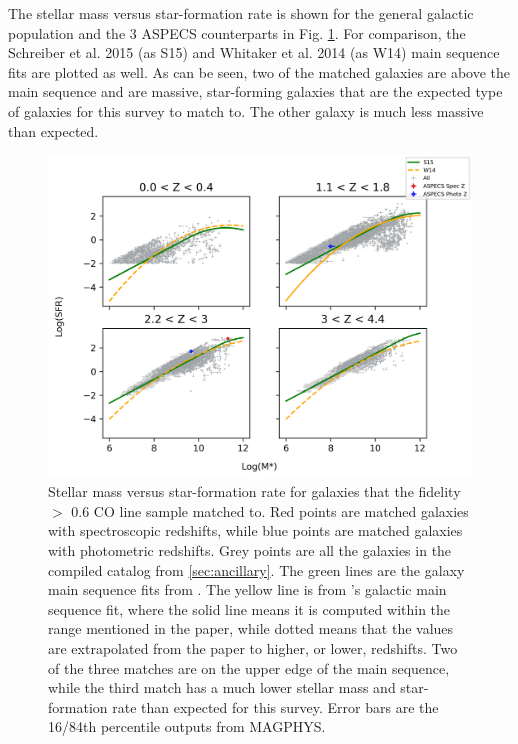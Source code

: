 The stellar mass versus star-formation rate is shown for the general galactic population and the 3 ASPECS counterparts in Fig. \ref{fig:Cross_match}. For comparison, the Schreiber et al. 2015 \cite{schreiber2015herschel} (as S15) and Whitaker et al. 2014 \cite{Whitaker_2014} (as W14) main sequence fits are plotted as well. As can be seen, two of the matched galaxies are above the main sequence and are massive, star-forming galaxies that are the expected type of galaxies for this survey to match to. The other galaxy is much less massive than expected. 

\begin{figure}[!htbp]
\centering \includegraphics[width=120mm]{Survey/No_Cut_Mstar_vs_SFR_all_closest_sep_1_0_sn_fid_60.png}
\caption{Stellar mass versus star-formation rate for galaxies that the fidelity $>$ 0.6 CO line sample matched to. Red points are matched galaxies with spectroscopic redshifts, while blue points are matched galaxies with photometric redshifts. Grey points are all the galaxies in the compiled catalog from \ref{sec:ancillary}. The green lines are the galaxy main sequence fits from \cite{schreiber2015herschel}. The yellow line is from \cite{Whitaker_2014}'s galactic main sequence fit, where the solid line means it is computed within the range mentioned in the paper, while dotted means that the values are extrapolated from the paper to higher, or lower, redshifts. Two of the three matches are on the upper edge of the main sequence, while the third match has a much lower stellar mass and star-formation rate than expected for this survey. Error bars are the 16/84th percentile outputs from MAGPHYS.}
\label{fig:Cross_match}
\end{figure}

